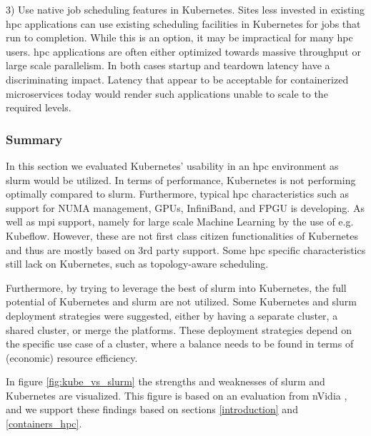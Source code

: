 \documentclass[12pt]{article}
\begin{document}
3) Use native job scheduling features in Kubernetes. Sites less invested in existing \gls{hpc} applications can use existing scheduling facilities in Kubernetes for jobs that run to completion. While this is an option, it may be impractical for many \gls{hpc} users. \gls{hpc} applications are often either optimized towards massive throughput or large scale parallelism. In both cases startup and teardown latency have a discriminating impact. Latency that appear to be acceptable for containerized microservices today would render such applications unable to scale to the required levels.

\subsubsection{Summary}
In this section we evaluated Kubernetes' usability in an \gls{hpc} environment as \gls{slurm} would be utilized. In terms of performance, Kubernetes is not performing optimally compared to \gls{slurm}. Furthermore, typical \gls{hpc} characteristics such as support for NUMA management, GPUs, InfiniBand, and FPGU is developing. As well as \gls{mpi} support, namely for large scale Machine Learning by the use of e.g. Kubeflow. However, these are not first class citizen functionalities of Kubernetes and thus are mostly based on 3rd party support. Some \gls{hpc} specific characteristics still lack on Kubernetes, such as topology-aware scheduling.

Furthermore, by trying to leverage the best of \gls{slurm} into Kubernetes, the full potential of Kubernetes and \gls{slurm} are not utilized. Some Kubernetes and \gls{slurm} deployment strategies were suggested, either by having a separate cluster, a shared cluster, or merge the platforms. These deployment strategies depend on the specific use case of a cluster, where a balance needs to be found in terms of (economic) resource efficiency.

In figure \ref{fig:kube_vs_slurm} the strengths and weaknesses of \gls{slurm} and Kubernetes are visualized. This figure is based on an evaluation from nVidia \cite{nvidia-slurm-containers}, and we support these findings based on sections \ref{introduction} and \ref{containers_hpc}.
\end{document}
